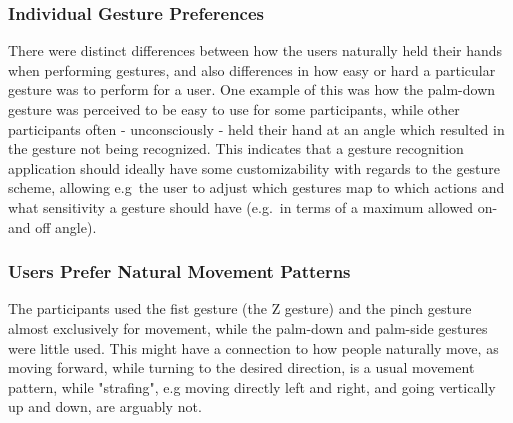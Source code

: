 \subsubsection{Individual Gesture Preferences}
There were distinct differences between how the users naturally held their hands when performing gestures, and also differences in how easy or hard a particular gesture 
was to perform for a user. One example of this was how the palm-down gesture was perceived to be easy to use for some participants, while other participants 
often - unconsciously - held their hand at an angle which resulted in the gesture not being recognized.
This indicates that a gesture recognition application should ideally have some customizability with regards to the gesture scheme, allowing e.g~the user to adjust
which gestures map to which actions and what sensitivity a gesture should have (e.g.~in terms of a maximum allowed on- and off angle).

\subsubsection{Users Prefer Natural Movement Patterns}
The participants used the fist gesture (the Z gesture) and the pinch gesture almost exclusively for movement, while the palm-down and palm-side gestures were little used. 
This might have a connection to how people naturally move, as moving forward, while turning to the desired direction, is a usual movement pattern, while "strafing", e.g 
moving directly left and right, and going vertically up and down, are arguably not. \\\\






% 

